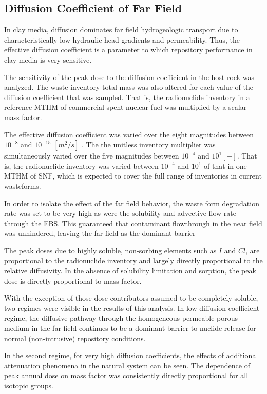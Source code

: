 
\subsection{Diffusion Coefficient of Far Field}
\label{sec:diffusivity}

In clay media, diffusion dominates far field hydrogeologic transport due to 
characteristically low hydraulic head gradients and permeability. Thus, the 
effective diffusion coefficient is a parameter to which repository performance 
in clay media is very sensitive. 

The sensitivity of the peak dose to the diffusion coefficient in the 
host rock was analyzed. 
The waste inventory total mass was also altered for each value of the diffusion  
coefficient that was sampled. That is, the radionuclide inventory in a reference 
\gls{MTHM} of commercial spent nuclear fuel was multiplied by a scalar mass factor.  

The effective diffusion coefficient was varied over the eight magnitudes between $ 
10^{-8}$ and $10^{-15}$ $[m^2 /s]$ .  The the unitless inventory 
multiplier was simultaneously varied over the five magnitudes between $10^{-4}$ 
and $10^{1} [-]$. That is, the radionuclide inventory was varied between 
$10^{-4}$ and $10^{1}$ of that in one \gls{MTHM} of \gls{SNF}, which is expected 
to cover the full range of inventories in current wasteforms.

In order to isolate the effect of the far field behavior, the waste form 
degradation rate was set to be very high as were the solubility and advective 
flow rate through the  \gls{EBS}. This guaranteed that contaminant flowthrough 
in the near field was unhindered, leaving the far field as the dominant barrier 

The peak doses due to highly soluble, non-sorbing elements such as $I$ and $Cl$, 
are  proportional to the radionuclide inventory and 
largely directly proportional to the relative diffusivity. In the absence of 
solubility limitation and sorption, the peak dose is directly proportional to 
mass factor. 

With the exception of those dose-contributors assumed to be completely soluble, 
two regimes were visible in the results of this analysis. In low diffusion 
coefficient regime, the diffusive pathway through the homogeneous permeable 
porous medium in the far field continues to be a  dominant barrier to nuclide 
release for normal (non-intrusive) repository conditions. 

In the second regime, for very high diffusion coefficients, the effects of 
additional attenuation phenomena in the natural system can be seen.  The 
dependence of peak annual dose on mass factor was consistently directly 
proportional for all isotopic groups.

